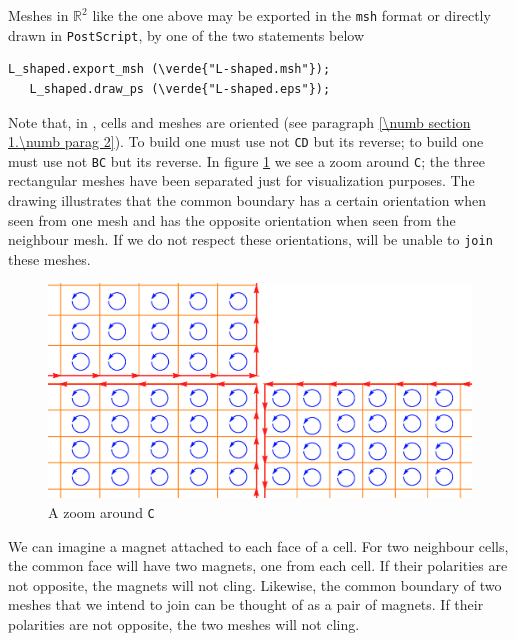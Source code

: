 Meshes in $ \mathbb{R}^2 $ like the one above may be exported in the {\small\tt msh} format
or directly drawn in {\small\tt PostScript}, by one of the two statements below

\begin{Verbatim}[commandchars=\\\{\},formatcom=\small\tt,baselinestretch=0.94]
   L_shaped.export_msh (\verde{"L-shaped.msh"});
   L_shaped.draw_ps (\verde{"L-shaped.eps"});
\end{Verbatim}

Note that, in \maniFEM, cells and meshes are oriented
(see paragraph \ref{\numb section 1.\numb parag 2}).
To build {\small\tt {}} one must use not {\small\tt CD} but its reverse;
to build {\small\tt {}} one must use not {\small\tt BC} but its reverse.
In figure \ref{\numb section 1.\numb fig 6} we see a zoom around {\small\tt C};
the three rectangular meshes have been separated just for visualization purposes.
The drawing illustrates that the common boundary has a certain orientation when seen
from one mesh and has the opposite orientation when seen from the neighbour mesh.
If we do not respect these orientations, {\maniFEM} will be unable to {\small\tt join}
these meshes.

\begin{figure}[ht]  \centering
  \includegraphics[width=120mm]{L-crack}
  \caption{A zoom around {\small\tt C}}
  \label{\numb section 1.\numb fig 6}
\end{figure}

We can imagine a magnet attached to each face of a cell.
For two neighbour cells, the common face will have two magnets, one from each cell.
If their polarities are not opposite, the magnets will not cling.
Likewise, the common boundary of two meshes that we intend to join can be thought of
as a pair of magnets.
If their polarities are not opposite, the two meshes will not cling.

